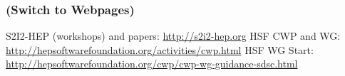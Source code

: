 \begin{frame}
\frametitle{(Switch to Webpages)}

S2I2-HEP (workshops) and papers: \url{http://s2i2-hep.org}
\vskip 0.15in
HSF CWP and WG: \url{http://hepsoftwarefoundation.org/activities/cwp.html}
\vskip 0.15in
HSF WG Start:
\url{http://hepsoftwarefoundation.org/cwp/cwp-wg-guidance-sdsc.html}
\end{frame}


